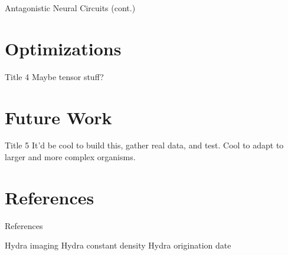 \documentclass[leqno,presentation,unknownkeysallowed]{beamer}
\newcommand{\hiddensection}[1]{\stepcounter{section}\section*{{#1}}}
\begin{document}
\begin{frame}{Antagonistic Neural Circuits (cont.)}

\end{frame}


\section{Optimizations}

\begin{frame}{Title 4}
Maybe tensor stuff?
\end{frame}

\section{Future Work}

\begin{frame}{Title 5}
It'd be cool to build this, gather real data, and test. Cool to adapt to larger and more complex organisms.
\end{frame}

\hiddensection{References}

\begin{frame}{References}
\begin{thebibliography}{10}
 Hydra imaging
 Hydra constant density
 Hydra origination date
\end{thebibliography}
\end{frame}

\end{document}
